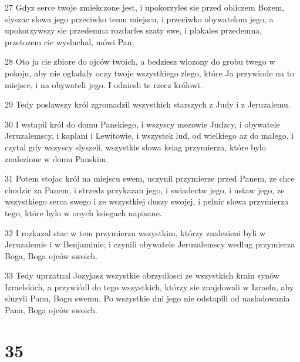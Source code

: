 \par 27 Gdyz serce twoje zmiekczone jest, i upokorzyles sie przed obliczem Bozem, slyszac slowa jego przeciwko temu miejscu, i przeciwko obywatelom jego, a upokorzywszy sie przedemna rozdarles szaty swe, i plakales przedemna, przetozem cie wysluchal, mówi Pan;
\par 28 Oto ja cie zbiore do ojców twoich, a bedziesz wlozony do grobu twego w pokoju, aby nie ogladaly oczy twoje wszystkiego zlego, które Ja przywiode na to miejsce, i na obywateli jego. I odniesli te rzecz królowi.
\par 29 Tedy poslawszy król zgromadzil wszystkich starszych z Judy i z Jeruzalemu.
\par 30 I wstapil król do domu Panskiego, i wszyscy mezowie Judzcy, i obywatele Jeruzalemscy, i kaplani i Lewitowie, i wszystek lud, od wielkiego az do malego, i czytal gdy wszyscy slyszeli, wszystkie slowa ksiag przymierza, które bylo znalezione w domu Panskim.
\par 31 Potem stojac król na miejscu swem, uczynil przymierze przed Panem, ze chce chodzic za Panem, i strzedz przykazan jego, i swiadectw jego, i ustaw jego, ze wszystkiego serca swego i ze wszystkiej duszy swojej, i pelnic slowa przymierza tego, które bylo w onych ksiegach napisane.
\par 32 I rozkazal stac w tem przymierzu wszystkim, którzy znalezieni byli w Jeruzalemie i w Benjaminie; i czynili obywatele Jeruzalemscy wedlug przymierza Boga, Boga ojców swoich.
\par 33 Tedy uprzatnal Jozyjasz wszystkie obrzydlosci ze wszystkich krain synów Izraelskich, a przywiódl do tego wszystkich, którzy sie znajdowali w Izraelu, aby sluzyli Panu, Bogu swemu. Po wszystkie dni jego nie odstapili od nasladowania Pana, Boga ojców swoich.

\chapter{35}

